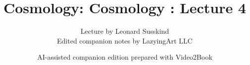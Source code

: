 \documentclass[11pt,oneside]{book}
\begin{document}
\frontmatter
\title{Cosmology: Cosmology : Lecture 4}
\author{Lecture by Leonard Susskind\\Edited companion notes by LazyingArt LLC}
\date{AI-assisted companion edition prepared with Video2Book}
\maketitle
\clearpage
\mainmatter

\end{document}
